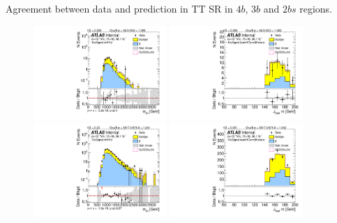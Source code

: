\begin{table}[htbp!]
\begin{center}

\end{center}
\caption{Agreement between data and prediction in TT SR in $4b$, $3b$ and $2bs$ regions.}
\label{CRSB:DataPred_TTSR}
\end{table}


\begin{figure}[htbp!]
\begin{center}
\includegraphics[width=0.45\textwidth,angle=-90]{figures/boosted/TT/Moriond_TT_FourTag_Signal_mHH_l_1.pdf}
\includegraphics[width=0.45\textwidth,angle=-90]{figures/boosted/TT/Moriond_TT_FourTag_Signal_leadHCand_Mass_s.pdf}\\
\includegraphics[width=0.45\textwidth,angle=-90]{figures/boosted/TT/Moriond_TT_ThreeTag_Signal_mHH_l_1.pdf}
\includegraphics[width=0.45\textwidth,angle=-90]{figures/boosted/TT/Moriond_TT_ThreeTag_Signal_leadHCand_Mass_s.pdf}\\

\end{center}
\end{figure}
